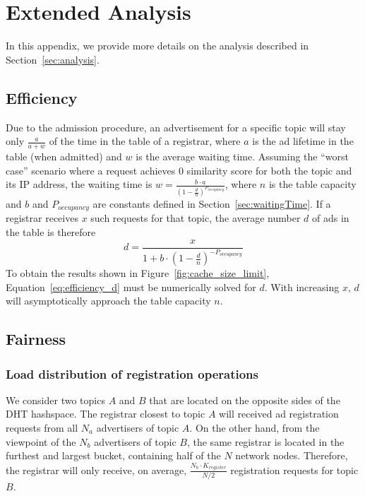 \appendix\label{sec:appendix}
\section{Extended Analysis}

In this appendix, we provide more details on the analysis described in Section~\ref{sec:analysis}.

\subsection{Efficiency}

Due to the admission procedure, an advertisement for a specific topic will stay only $\frac{a}{a+w}$ of the time in the table of a registrar, where $a$ is the ad lifetime in the table (when admitted) and $w$ is the average waiting time. Assuming the ``worst case'' scenario where a request achieves 0 similarity score for both the topic and its IP address, the waiting time is $w = \frac{b\cdot a}{(1 - \frac{d}{n})^{P_{occupancy}}}$, where $n$ is the table capacity and $b$ and $P_{occupancy}$ are constants defined in Section~\ref{sec:waitingTime}.
If a registrar receives $x$ such requests for that topic, the average number $d$ of ads in the table is therefore
\begin{equation}
d = \frac{x}{1 + b \cdot (1 - \frac{d}{n})^{-P_{occupancy}}} \label{eq:efficiency_d}
\end{equation}
To obtain the results shown in Figure~\ref{fig:cache_size_limit}, Equation~\ref{eq:efficiency_d} must be numerically solved for $d$. With increasing $x$, $d$ will asymptotically approach the table capacity $n$.

\subsection{Fairness}

\subsubsection{Load distribution of registration operations}

We consider two topics $A$ and $B$ that are located on the opposite sides of the DHT hashspace. The registrar closest to topic $A$ will received ad registration requests from all $N_a$ advertisers of topic $A$. On the other hand, from the viewpoint of the $N_b$ advertisers of topic $B$, the same registrar is located in the furthest  and largest bucket, containing half of the $N$ network nodes. Therefore, the registrar will only receive, on average, $\frac{N_b\cdot K_{register}}{N/2}$ registration requests for topic $B$.

